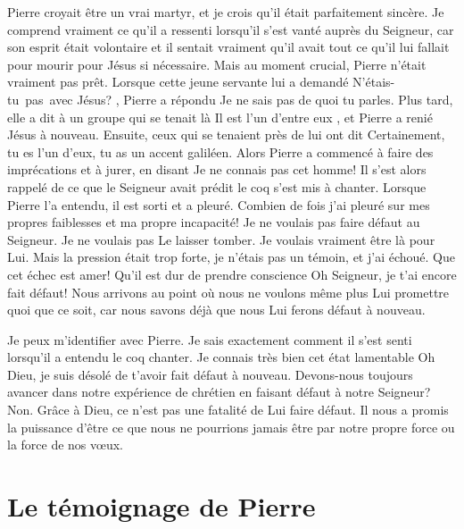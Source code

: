 Pierre croyait être un vrai martyr,
 et je crois qu'il était parfaitement sincère.
 Je comprend vraiment ce qu'il a ressenti lorsqu'il s'est vanté
 auprès du Seigneur, car son esprit était volontaire et il sentait
 vraiment qu'il avait tout ce qu'il lui fallait pour mourir pour Jésus
 si nécessaire. Mais au moment crucial, Pierre n'était vraiment pas prêt.
 Lorsque cette jeune servante lui a demandé\frcolon{}
 \Og N'étais-tu~pas~avec Jésus? \Fg{}, Pierre a répondu\frcolon{}
 \Og Je ne sais pas de quoi tu parles. \Fg{}
 Plus tard, elle a dit à un groupe qui se tenait là\frcolon{}
 \Og Il est l'un d'entre eux \Fg{}, et Pierre a renié Jésus à nouveau.
 Ensuite, ceux qui se tenaient près de lui ont dit\frcolon{}
 \Og Certainement, tu es l'un d'eux, tu as un accent galiléen. \Fg{}
 Alors Pierre a commencé à faire des imprécations et à jurer, en disant\frcolon{}
 \Og Je ne connais pas cet homme! \Fg{}
 Il s'est alors rappelé de ce que le Seigneur avait prédit\frcolon{}
 le coq s'est mis à chanter.
 Lorsque Pierre l'a entendu, il est sorti et a pleuré.
 Combien de fois j'ai pleuré sur mes propres faiblesses
 et ma propre incapacité! Je ne voulais pas faire défaut au Seigneur.
 Je ne voulais pas Le laisser tomber. Je voulais vraiment être là pour Lui.
 Mais la pression était trop forte, je n'étais pas un témoin,
 et j'ai échoué. Que cet échec est amer!
 Qu'il est dur de prendre conscience\frcolon{}
 \Og Oh Seigneur, je t'ai encore fait défaut! \Fg{}
 Nous arrivons au point où nous ne voulons même plus Lui promettre quoi
 que ce soit, car nous savons déjà que nous Lui ferons défaut à nouveau.

Je peux m'identifier avec Pierre.
 Je sais exactement comment il s'est senti lorsqu'il a entendu le coq chanter.
 Je connais très bien cet état lamentable\frcolon{}
 \Og Oh Dieu, je suis désolé de t'avoir fait défaut à nouveau. \Fg{}
 Devons-nous toujours avancer dans notre expérience de chrétien
 en faisant défaut à notre Seigneur? Non.
 Grâce à Dieu, ce n'est pas une fatalité de Lui faire défaut.
 Il nous a promis la puissance d'être ce que nous ne pourrions
 jamais être par notre propre force ou la force de nos vœux.


\section{Le t\'emoignage de Pierre}

